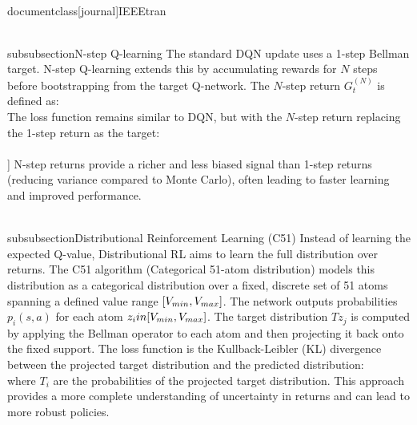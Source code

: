 \\documentclass[journal]{IEEEtran}
\begin{document}
\\subsubsection{N-step Q-learning}
The standard DQN update uses a 1-step Bellman target. N-step Q-learning \cite{watkins1989learning} extends this by accumulating rewards for $N$ steps before bootstrapping from the target Q-network. The $N$-step return $G_t^{(N)}$ is defined as:
\\[
G_t^{(N)} = \\sum_{k=0}^{N-1} \\gamma^k r_{t+k+1} + \\gamma^N \\max_{a\'} Q(s_{t+N}, a\'; \\theta^-) (1 - d_{t+N})
\\]
The loss function remains similar to DQN, but with the $N$-step return replacing the 1-step return as the target:
\\[
L(\\theta) = \\mathbb{E}_{(s,a,r,s\',d) \\sim U(\\mathcal{D})} \\left[ \\left( G_t^{(N)} - Q(s_t, a_t; \\theta) \\right)^2 \\right]
\\]
N-step returns provide a richer and less biased signal than 1-step returns (reducing variance compared to Monte Carlo), often leading to faster learning and improved performance.

\\subsubsection{Distributional Reinforcement Learning (C51)}
Instead of learning the expected Q-value, Distributional RL \cite{bellemare2017distributional} aims to learn the full distribution over returns. The C51 algorithm (Categorical 51-atom distribution) models this distribution as a categorical distribution over a fixed, discrete set of 51 atoms spanning a defined value range $[V_{\\min}, V_{\\max}]$.
The network outputs probabilities $p_i(s, a)$ for each atom $z_i \\in [V_{\\min}, V_{\\max}]$. The target distribution $Tz_j$ is computed by applying the Bellman operator to each atom and then projecting it back onto the fixed support. The loss function is the Kullback-Leibler (KL) divergence between the projected target distribution and the predicted distribution:
\\[
L_{C51}(\\theta) = - \\sum_i T_i \\log p_i(s,a;\\theta)
\\]
where $T_i$ are the probabilities of the projected target distribution. This approach provides a more complete understanding of uncertainty in returns and can lead to more robust policies.
\end{document}
